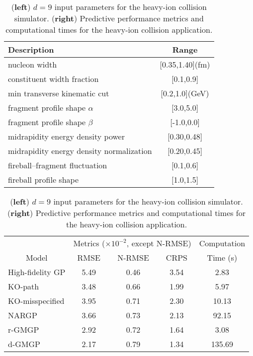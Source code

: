 \documentclass[12pt]{article}
\begin{document}
\begin{table}
\parbox{.48\textwidth}{
\centering
\begin{adjustbox}{max width=0.47\textwidth}
\begin{tabular}{p{6cm} c}
    \toprule
    {Description} & {Range} \\
    \midrule
     {nucleon width} & {[0.35,1.40](fm)} \\
    {constituent width fraction} & {[0.1,0.9]} \\
    {min transverse kinematic cut} & {[0.2,1.0](GeV)} \\
     {fragment profile shape $\alpha$} & {[3.0,5.0]}  \\
    {fragment profile shape $\beta$} & {[-1.0,0.0]} \\
    {midrapidity energy density power} & {[0.30,0.48]} \\
    {midrapidity energy density normalization} & {[0.20,0.45]} \\
   {fireball--fragment fluctuation} & {[0.1,0.6]} \\
   {fireball profile shape} & {[1.0,1.5]} \\
    \bottomrule
\end{tabular}
\end{adjustbox}
}
\hspace{0.3cm}
\parbox{.48\textwidth}{
\centering
\begin{adjustbox}{max width=0.47\textwidth}
\begin{tabular}{l c c c c}
    \toprule
    \multicolumn{1}{c}{} & 
    \multicolumn{3}{c}{Metrics ($\times 10^{-2}$, except N-RMSE)} & 
    \multicolumn{1}{c}{Computation}\\
    \cmidrule(lr){2-5}  
    \multicolumn{1}{c}{Model} & {RMSE} & {N-RMSE} & {CRPS} & {Time (s)} \\
    \midrule
    {High-fidelity GP} & {5.49} & {0.46} & {3.54} & {2.83}\\
    {KO-path} & {3.48} & {0.66} & {1.99} & {5.97}\\
    {KO-misspecified} & {3.95} & {0.71} & {2.30} & {10.13} \\
    {NARGP} & {3.66} & {0.73} & {2.13} & {92.15} \\
    {r-GMGP} & {2.92} & {0.72} & {1.64} & {3.08} \\
    {d-GMGP} & {2.17} & {0.79} & {1.34} & {135.69} \\
    \bottomrule
\end{tabular}
\end{adjustbox}
}
\caption{(\textbf{left}) $d=9$ input parameters for the heavy-ion collision simulator. (\textbf{right}) Predictive performance metrics and computational times for the heavy-ion collision application.}
\label{tab:QGP_APP}
\end{table}
\end{document}
